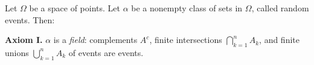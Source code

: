Let $\Omega$ be a space of points. Let $\alpha$ be a nonempty class of sets in $\Omega$, called random events. Then:

\textbf{Axiom I.} $\alpha$ is a \textit{field}: complements $A^c$, finite intersections $\bigcap_{k=1}^{n} A_k$, and finite unions $\bigcup_{k=1}^{n} A_k$ of events are events.
